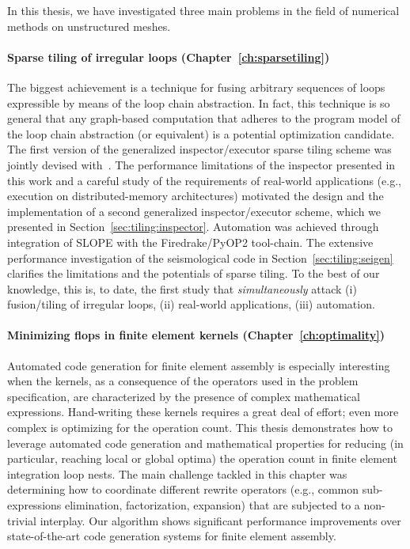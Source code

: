 In this thesis, we have investigated three main problems in the field of numerical methods on unstructured meshes.

\paragraph{Sparse tiling of irregular loops (Chapter~\ref{ch:sparsetiling})} The biggest achievement is a technique for fusing arbitrary sequences of loops expressible by means of the loop chain abstraction. In fact, this technique is so general that any graph-based computation that adheres to the program model of the loop chain abstraction (or equivalent) is a potential optimization candidate. The first version of the generalized inspector/executor sparse tiling scheme was jointly devised with~\cite{st-paper}. The performance limitations of the inspector presented in this work and a careful study of the requirements of real-world applications (e.g., execution on distributed-memory architectures) motivated the design and the implementation of a second generalized inspector/executor scheme, which we presented in Section~\ref{sec:tiling:inspector}. Automation was achieved through integration of SLOPE with the Firedrake/PyOP2 tool-chain. The extensive performance investigation of the seismological code in Section~\ref{sec:tiling:seigen} clarifies the limitations and the potentials of sparse tiling. To the best of our knowledge, this is, to date, the first study that {\it simultaneously} attack (i) fusion/tiling of irregular loops, (ii) real-world applications, (iii) automation.

\paragraph{Minimizing flops in finite element kernels (Chapter~\ref{ch:optimality})} Automated code generation for finite element assembly is especially interesting when the kernels, as a consequence of the operators used in the problem specification, are characterized by the presence of complex mathematical expressions. Hand-writing these kernels requires a great deal of effort; even more complex is optimizing for the operation count. This thesis demonstrates how to leverage automated code generation and mathematical properties for reducing (in particular, reaching local or global optima) the operation count in finite element integration loop nests. The main challenge tackled in this chapter was determining how to coordinate different rewrite operators (e.g., common sub-expressions elimination, factorization, expansion) that are subjected to a non-trivial interplay. Our algorithm shows significant performance improvements over state-of-the-art code generation systems for finite element assembly. 

